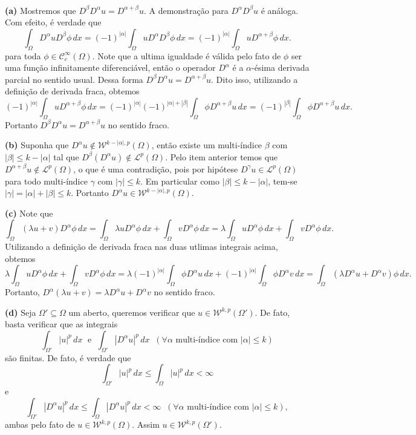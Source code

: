 \documentclass[a4paper, 11pt]{book}
\theoremstyle{definition}
\newcommand{\cC}{\mathcal{C}}
\newcommand{\cL}{\mathcal{L}}
\newcommand{\cW}{\mathcal{W}}
\begin{document}
\begin{prf}
    ~

    \textbf{(a)} Mostremos que $D^{\beta}D^{\alpha} u = D^{\alpha + \beta}u$.
    A demonstração para $D^{\alpha}D^{\beta} u$ é análoga.
    Com efeito, é verdade que
    \[
        \int_\Omega D^{\alpha} u D^{\beta} \phi \, dx = (-1)^{|\alpha|} \int_\Omega u D^{\alpha} D^{\beta} \phi \, dx = (-1)^{|\alpha|} \int_\Omega u D^{\alpha + \beta} \phi \,dx.
    \]
    para toda $\phi \in \cC^{\infty}_c(\Omega)$. Note que a ultima igualdade é válida pelo fato de $\phi$ ser uma função infinitamente diferenciável, então o operador $D^\alpha$ é a $\alpha$-ésima derivada parcial no sentido usual.
    Dessa forma $D^{\beta}D^{\alpha} u = D^{\alpha + \beta} u$.
    Dito isso, utilizando a definição de derivada fraca, obtemos
    \[
        (-1)^{|\alpha|} \int_\Omega u D^{\alpha + \beta} \phi \,dx = (-1)^{|\alpha|}(-1)^{|\alpha| + |\beta|} \int_\Omega \phi D^{\alpha+\beta} u \,dx = (-1)^{|\beta|} \int_\Omega \phi D^{\alpha + \beta} u \,dx.
    \]
    Portanto $D^{\beta} D^{\alpha} u = D^{\alpha + \beta} u$ no sentido fraco.

    \textbf{(b)} Suponha que $D^\alpha u \not\in \cW^{k-|\alpha|,p}(\Omega)$, então existe um multi-índice $\beta$ com $|\beta| \leqslant k - |\alpha|$ tal que $D^{\beta}(D^{\alpha}u) \not\in \cL^p(\Omega)$.
    Pelo item anterior temos que $D^{\alpha+\beta}u \not\in \cL^p(\Omega)$, o que é uma contradição, pois por hipótese $D^{\gamma}u \in \cL^p(\Omega)$ para todo multi-índice $\gamma$ com $|\gamma| \leqslant k$. Em particular como $|\beta| \leqslant k - |\alpha|$, tem-se $|\gamma| = |\alpha| + |\beta| \leqslant k$.
    Portanto $D^{\alpha}u \in \cW^{k-|\alpha|,p}(\Omega)$.

    \textbf{(c)} Note que
    \[
        \int_\Omega (\lambda u + v) D^{\alpha}\phi \,dx = \int_\Omega \lambda u D^\alpha \phi \, dx + \int_\Omega v D^\alpha \phi \, dx = \lambda \int_\Omega u D^{\alpha} \phi \,dx + \int_\Omega v D^{\alpha} \phi \, dx.
    \]
    Utilizando a definição de derivada fraca nas duas utlimas integrais acima, obtemos
    {\small
    \[
        \lambda \int_\Omega u D^{\alpha} \phi \,dx + \int_\Omega v D^{\alpha} \phi \, dx = \lambda (-1)^{|\alpha|} \int_\Omega \phi D^{\alpha} u \, dx + (-1)^{|\alpha|}\int_\Omega \phi D^{\alpha} v \, dx = \int_\Omega (\lambda D^{\alpha}u + D^{\alpha}v )\phi \,dx.
    \]}\!
    Portanto, $D^{\alpha}(\lambda u + v) = \lambda D^\alpha u + D^\alpha v$ no sentido fraco.

    \textbf{(d)} Seja $\Omega' \subseteq \Omega$ um aberto, queremos verificar que $u \in \cW^{k,p}(\Omega')$.
    De fato, basta verificar que as integrais
    \[
        \int_{\Omega'} |u|^p \, dx \;\text{ e }\; \int_{\Omega'} |D^{\alpha}u|^p \, dx \;\; (\forall \alpha \text{ multi-índice com }|\alpha| \leqslant k)
    \]
    são finitas. De fato, é verdade que
    \[
        \int_{\Omega'} |u|^p \, dx \leqslant \int_{\Omega} |u|^p \,dx < \infty
    \]
    e
    \[
        \int_{\Omega'} |D^\alpha u|^p \, dx \leqslant \int_{\Omega} |D^\alpha u|^p \,dx < \infty \;\; (\forall \alpha \text{ multi-índice com }|\alpha| \leqslant k),
    \]
    ambas pelo fato de $u \in \cW^{k,p}(\Omega)$.
    Assim $u \in \cW^{k,p}(\Omega')$.


\end{prf}
\end{document}
